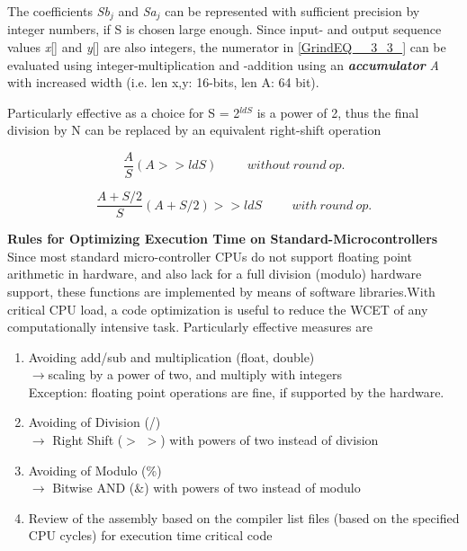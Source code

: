 The coefficients \textit{Sb${}_{j}$ }and \textit{Sa${}_{j}$} can be represented with sufficient precision by integer numbers, if S is chosen large enough. Since input- and output sequence values \textit{x}[] and \textit{y}[] are also integers, the numerator in \eqref{GrindEQ__3_3_} can be evaluated using integer-multiplication and -addition using an \textbf{\textit{accumulator}} \textit{A} with increased width (i.e. len x,y: 16-bits, len A: 64 bit). 

Particularly effective as a choice for S = 2\textit{${}^{ldS}$} is a power of 2, thus the final division by N can be replaced by an equivalent right-shift operation  

\begin{equation}
	\frac{A}{S}      (\textit{A} >> \textit{ldS})  \hspace{1cm}    without\ round\ op. \nonumber
\label{EQ }
\end{equation}

\begin{equation}
	\frac{A+S/2}{S}     (\textit{A} + S/2) >> \textit{ldS}  \hspace{1cm}  with\ round\ op. \nonumber
\label{EQ }
\end{equation}

{\rot\bf Rules for Optimizing Execution Time on Standard-Microcontrollers}\\

Since most standard micro-controller CPUs do not support floating point arithmetic in hardware, and also lack for a full division (modulo) hardware support, these functions are implemented by means of software libraries.With critical CPU load, a code optimization is useful to reduce the WCET of any computationally intensive task. Particularly effective measures are

\begin{enumerate}

\item  Avoiding add/sub and multiplication (float, double) \\$\rightarrow$scaling by a power of two, and multiply with integers \\ Exception: floating point operations are fine, if supported by the hardware.

\item  Avoiding of Division (/)\\$\rightarrow$ Right Shift ($\mathrm{>}$ $\mathrm{>}$) with powers of two instead of division

\item  Avoiding of Modulo (\%) \\$\rightarrow$ Bitwise AND (\&) with powers of two instead of modulo

\item  Review of the assembly based on the compiler list files (based on the specified CPU cycles) for execution time critical code
\end{enumerate}

